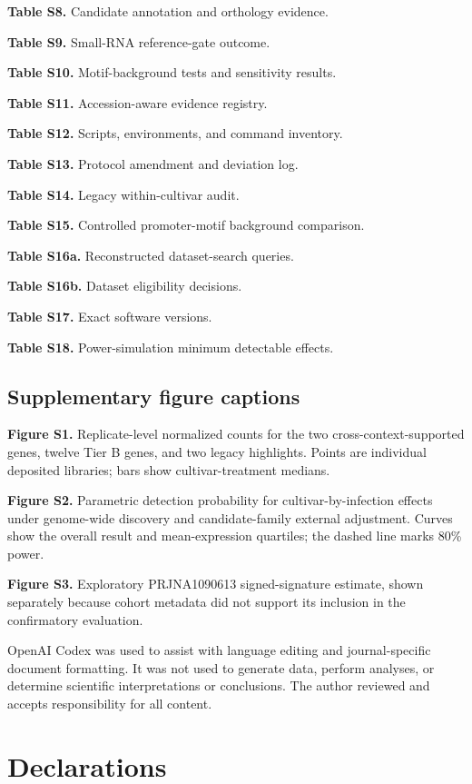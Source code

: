 \documentclass[referee,pdflatex,sn-basic,Numbered]{sn-jnl}
\begin{document}
\textbf{Table S8.} Candidate annotation and orthology evidence.

\textbf{Table S9.} Small-RNA reference-gate outcome.

\textbf{Table S10.} Motif-background tests and sensitivity results.

\textbf{Table S11.} Accession-aware evidence registry.

\textbf{Table S12.} Scripts, environments, and command inventory.

\textbf{Table S13.} Protocol amendment and deviation log.

\textbf{Table S14.} Legacy within-cultivar audit.

\textbf{Table S15.} Controlled promoter-motif background comparison.

\textbf{Table S16a.} Reconstructed dataset-search queries.

\textbf{Table S16b.} Dataset eligibility decisions.

\textbf{Table S17.} Exact software versions.

\textbf{Table S18.} Power-simulation minimum detectable effects.

\subsection*{Supplementary figure captions}

\textbf{Figure S1.} Replicate-level normalized counts for the two cross-context-supported genes, twelve Tier B genes, and two legacy highlights. Points are individual deposited libraries; bars show cultivar-treatment medians.

\textbf{Figure S2.} Parametric detection probability for cultivar-by-infection effects under genome-wide discovery and candidate-family external adjustment. Curves show the overall result and mean-expression quartiles; the dashed line marks 80\% power.

\textbf{Figure S3.} Exploratory PRJNA1090613 signed-signature estimate, shown separately because cohort metadata did not support its inclusion in the confirmatory evaluation.


OpenAI Codex was used to assist with language editing and journal-specific document formatting. It was not used to generate data, perform analyses, or determine scientific interpretations or conclusions. The author reviewed and accepts responsibility for all content.

\section*{Declarations}
\end{document}
